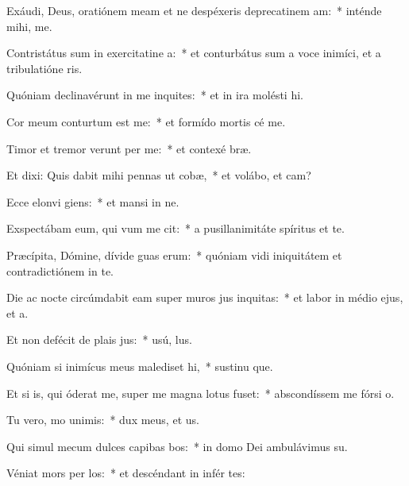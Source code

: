 \item Exáudi, Deus, oratiónem meam et ne despéxeris deprecatinem am:~* inténde mihi,   me.
\item Contristátus sum in exercitatine a:~* et conturbátus sum a voce inimíci, et a tribulatióne ris.
\item Quóniam declinavérunt in me inquites:~* et in ira molésti  hi.
\item Cor meum conturtum est  me:~* et formído mortis cé  me.
\item Timor et tremor verunt per me:~* et contexé  bræ.
\item Et dixi: Quis dabit mihi pennas ut cobæ,~* et volábo, et cam?
\item Ecce elonvi giens:~* et mansi in ne.
\item Exspectábam eum, qui vum me cit:~* a pusillanimitáte spíritus et te.
\item Præcípita, Dómine, dívide guas erum:~* quóniam vidi iniquitátem et contradictiónem in te.
\item Die ac nocte circúmdabit eam super muros jus inquitas:~* et labor in médio ejus, et a.
\item Et non defécit de plais jus:~* usú,  lus.
\item Quóniam si inimícus meus malediset hi,~* sustinu que.
\item Et si is, qui óderat me, super me magna lotus fuset:~* abscondíssem me fórsi  o.
\item Tu vero, mo unimis:~* dux meus, et  us.
\item Qui simul mecum dulces capibas bos:~* in domo Dei ambulávimus  su.
\item Véniat mors per los:~* et descéndant in infér tes:

